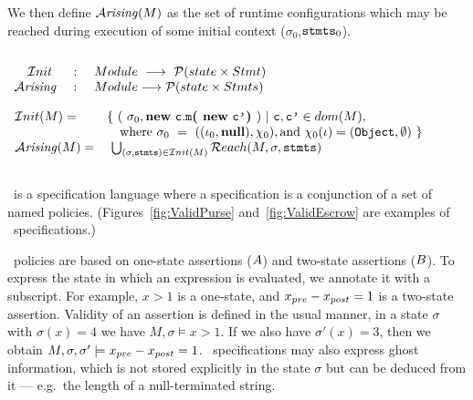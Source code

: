 \noindent We then define ${\mathcal{A}}\textrm{\textit{rising}}(M)$ as the set of runtime configurations
which may be reached during execution of some initial context
($\sigma_0$,${{\textrm{\ttfamily{stmts}}}}_0$).

\setcounter{definition}{6}
\begin{definition} 
$ ~ $

$\begin{array}{lcl}
{\ensuremath{ ~ }} {\hspace{.1in}} {\mathcal{I}nit} & \ : \ & {{Module}} \   \longrightarrow\  \mathcal{P}( {{state} \times {Stmt}}  )
\\
 {\mathcal{A}}\textrm{\textit{rising}} & : &  {{Module}}    \longrightarrow \mathcal{P}( {{state}} \times {Stmts}  )
\end{array}$

$\begin{array}{ll}
 {\mathcal{I}nit}(\M)   =  &  \{ \ (\ \sigma_0, \kw{new}\ \clss{}.\prg{m}\lp\kw{new}\  \clss{'} \rp) \ |    \ \clss{},\clss{'}\in dom( \M),\\
 & \ \ \ 
   \mbox{where}\  \sigma_0\ =\ ( (\iota_0,\kw{null}),\chi_0),    \mbox{and}\   \chi_0(\iota)=(\prg{Object}, \emptyset)\  \}
 \\
 \Arising(\M)    =   & \    \bigcup_{ (\sigma,\code{})\in  \mathcal{I}nit (\M)}  \Reach(\M, \sigma, \code{})
\end{array}$
\end{definition}




\subsection{\Chainmail}
\label{sect:Chainmail}

\Chainmail\ is a specification language where a specification is
a conjunction of a set of named policies.
(Figures~\ref{fig:ValidPurse} and~\ref{fig:ValidEscrow} are examples of
\Chainmail\ specifications.)

\Chainmail\ policies are based on one-state assertions ($A$) and two-state assertions ($B$).  To express the state in which an expression
is evaluated, we annotate it with a subscript. For example, $x>1$ is a one-state, and 
$ x_{{pre}} - x_{{post}} = 1$ is a two-state assertion. Validity of an assertion is defined in the usual manner, \eg 
in a state $\sigma$ with  $\sigma(x)=4$ we have   $M,\sigma \models x>1$. If we also have $\sigma'(x)=3$,
then we obtain    $M,\sigma,\sigma' \models x_{{pre}} - x_{{post}} =
1$.  \Chainmail\ specifications may also express ghost information,
which is not stored explicitly in the state $\sigma$ but can be
deduced from it --- e.g.\ the length of a null-terminated string.



